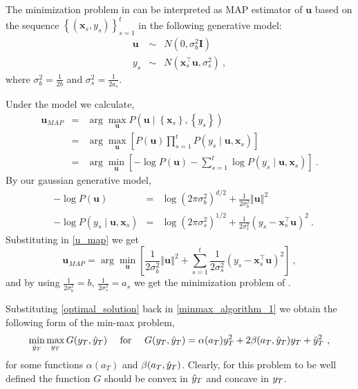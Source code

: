 \begin{Remark}
\label{MAP1}
The minimization problem in  can be interpreted as MAP estimator
of $\mathbf{u}$ based on the sequence $\left\{ \left(\mathbf{x}_{s},y_{s}\right)\right\} _{s=1}^{t}$
in the following generative model:
\begin{eqnarray*}
\mathbf{u} & \sim & N\left(0,\sigma_{b}^{2}\mathbf{I}\right)\\
y_{s} & \sim & N\left(\mathbf{x}_{s}^{\top}\mathbf{u},\sigma_{s}^{2}\right)~,
\end{eqnarray*}
where $\sigma_{b}^{2}=\frac{1}{2b}$ and $\sigma_{s}^{2}=\frac{1}{2a_{s}}$.

Under the model we calculate,
\begin{eqnarray}
\mathbf{u}_{MAP} & = & \arg\max_{\mathbf{u}}P\left(\mathbf{u}\mid\left\{ \mathbf{x}_{s}\right\} ,\left\{ y_{s}\right\} \right) \nonumber \\
 & = & \arg\max_{\mathbf{u}}\left[P\left(\mathbf{u}\right)\prod_{s=1}^{t}P\left(y_{s}\mid\mathbf{u},\mathbf{x}_{s}\right)\right] \nonumber \\
 & = & \arg\min_{\mathbf{u}}\left[-\log P\left(\mathbf{u}\right)-\sum_{s=1}^{t}\log P\left(y_{s}\mid\mathbf{u},\mathbf{x}_{s}\right)\right]~. \label{u_map}
\end{eqnarray}
By our gaussian generative model,
\begin{align*}
&-\log P\left(\mathbf{u}\right)&=&\log\left(2\pi\sigma_{b}^{2}\right)^{d/2}+\frac{1}{2\sigma_{b}^{2}}\left\Vert \mathbf{u}\right\Vert ^{2}\\
&-\log P\left(y_{s}\mid\mathbf{u},\mathbf{x}_{s}\right)&=&\log\left(2\pi\sigma_{s}^{2}\right)^{1/2}+\frac{1}{2\sigma_{s}^{2}}\left(y_{s}-\mathbf{x}_{s}^{\top}\mathbf{u}\right)^{2}~.
\end{align*}
Substituting in \eqref{u_map} we get
\[
 \mathbf{u}_{MAP}=\arg\min_{\mathbf{u}}\left[\frac{1}{2\sigma_{b}^{2}}\left\Vert \mathbf{u}\right\Vert ^{2}+\sum_{s=1}^{t}\frac{1}{2\sigma_{s}^{2}}\left(y_{s}-\mathbf{x}_{s}^{\top}\mathbf{u}\right)^{2}\right]~,
\]
and by using $\frac{1}{2\sigma_{b}^{2}}=b$,
$\frac{1}{2\sigma_{s}^{2}}=a_{s}$ we get the minimization
problem of .
\end{Remark}

Substituting \eqref{optimal_solution} back in
\eqref{minmax_algorithm_1} we obtain the following form of the min-max
problem,
%
\begin{align}
\min_{\hat{y}_{T}} \max_{y_{T}} G(y_{T},\hat{y}_{T}) \quad\textrm{ for }
\quad G(y_{T},\hat{y}_{T})= \alpha(a_T) y_{T}^2 + 2 \beta(a_T,
\hat{y}_{T}) y_{T} + \hat{y}_{T}^2 ~,\label{minmax_objective}
\end{align}
for some functions $\alpha(a_T)$ and $\beta(a_T, \hat{y}_{T})$. Clearly,
for this problem to be well defined the function $G$ should be convex
in $\hat{y}_{T}$ and concave in $y_{T}$.

